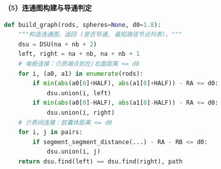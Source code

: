 \documentclass[12pt,a4paper,fontset=windows]{ctexart}
\begin{document}
\textbf{（5）连通图构建与导通判定}
\begin{lstlisting}[language=Python,basicstyle=\small\ttfamily]
def build_graph(rods, spheres=None, d0=1.8):
    """构造连通图，返回 (是否导通, 最短路径节点列表)。"""
    dsu = DSU(na + nb + 2)
    left, right = na + nb, na + nb + 1
    # 电极连接：介质端点到左/右面距离 <= d0
    for i, (a0, a1) in enumerate(rods):
        if min(abs(a0[0]+HALF), abs(a1[0]+HALF)) - RA <= d0:
            dsu.union(i, left)
        if min(abs(a0[0]-HALF), abs(a1[0]-HALF)) - RA <= d0:
            dsu.union(i, right)
    # 介质间连接：胶囊体距离 <= d0
    for i, j in pairs:
        if segment_segment_distance(...) - RA - RB <= d0:
            dsu.union(i, j)
    return dsu.find(left) == dsu.find(right), path
\end{lstlisting}
\end{document}
